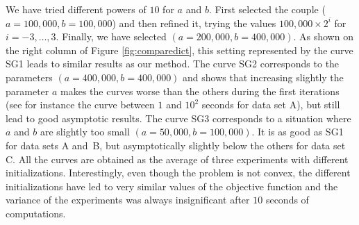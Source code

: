 \documentclass[twoside,11pt]{article}
\begin{document}
We have tried different powers of $10$ for $a$ and $b$. First selected the
couple ($a=100, 000, b=100, 000$) and then refined it, trying the values $100,
000\times2^i$ for $i=-3,\ldots,3$.  Finally, we have selected $(a=200, 000, b=400,
000)$.  As shown on the right column of Figure \ref{fig:comparedict}, this
setting represented by the curve \textsf{SG1} leads to similar results as our
method.  The curve \textsf{SG2} corresponds to the parameters $(a=400, 000,
b=400, 000)$ and shows that increasing slightly the parameter $a$ makes the
curves worse than the others during the first iterations (see for instance the
curve between $1$ and $10^2$ seconds for data set A), but still lead to good
asymptotic results.  The curve \textsf{SG3} corresponds to a situation where
$a$ and $b$ are slightly too small $(a=50, 000, b=100, 000)$. It is as good as
\textsf{SG1} for data sets A and~B, but asymptotically slightly below the others
for data set C.  All the curves are obtained as the average of three experiments
with different initializations. Interestingly, even though the problem is not
convex, the different initializations have led to very similar values of the
objective function and the variance of the experiments was always insignificant
after $10$ seconds of computations.
\end{document}
